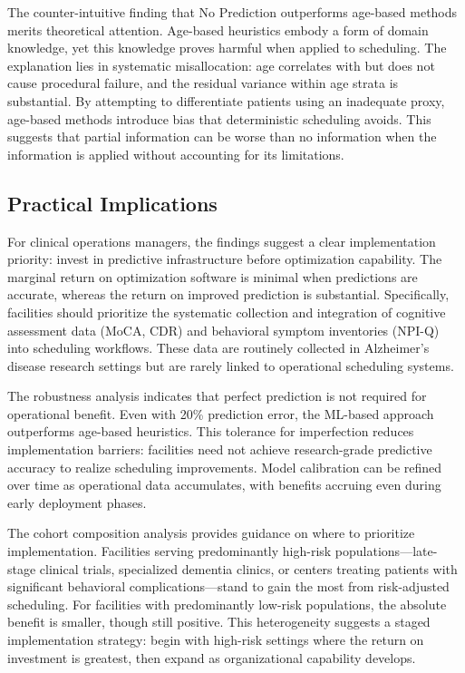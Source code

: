The counter-intuitive finding that No Prediction outperforms age-based methods merits theoretical attention. Age-based heuristics embody a form of domain knowledge, yet this knowledge proves harmful when applied to scheduling. The explanation lies in systematic misallocation: age correlates with but does not cause procedural failure, and the residual variance within age strata is substantial. By attempting to differentiate patients using an inadequate proxy, age-based methods introduce bias that deterministic scheduling avoids. This suggests that partial information can be worse than no information when the information is applied without accounting for its limitations.

\subsection{Practical Implications}

For clinical operations managers, the findings suggest a clear implementation priority: invest in predictive infrastructure before optimization capability. The marginal return on optimization software is minimal when predictions are accurate, whereas the return on improved prediction is substantial. Specifically, facilities should prioritize the systematic collection and integration of cognitive assessment data (MoCA, CDR) and behavioral symptom inventories (NPI-Q) into scheduling workflows. These data are routinely collected in Alzheimer's disease research settings but are rarely linked to operational scheduling systems.

The robustness analysis indicates that perfect prediction is not required for operational benefit. Even with 20\% prediction error, the ML-based approach outperforms age-based heuristics. This tolerance for imperfection reduces implementation barriers: facilities need not achieve research-grade predictive accuracy to realize scheduling improvements. Model calibration can be refined over time as operational data accumulates, with benefits accruing even during early deployment phases.

The cohort composition analysis provides guidance on where to prioritize implementation. Facilities serving predominantly high-risk populations---late-stage clinical trials, specialized dementia clinics, or centers treating patients with significant behavioral complications---stand to gain the most from risk-adjusted scheduling. For facilities with predominantly low-risk populations, the absolute benefit is smaller, though still positive. This heterogeneity suggests a staged implementation strategy: begin with high-risk settings where the return on investment is greatest, then expand as organizational capability develops.


